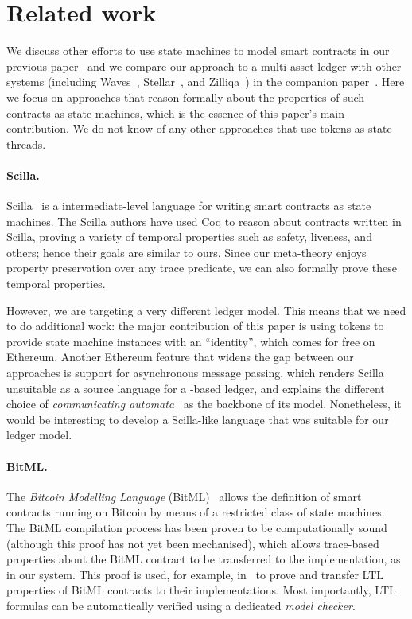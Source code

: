 \section{Related work}
\label{sec:related-work}

We discuss other efforts to use state machines to model smart
contracts in our previous paper~\cite{eutxo-1-paper} and we compare our
 approach to a multi-asset ledger with other systems (including Waves~\cite{waves}, Stellar~\cite{stellar}, and Zilliqa~\cite{scilla-arxiv}) in the companion
paper~\cite{plain-multicurrency}.
Here we focus on approaches that reason formally about the
properties of such contracts as state machines, which is the essence
of this paper's main contribution.
We do not know of any other approaches that use tokens as state threads.

\paragraph{Scilla.}
%
Scilla~\cite{scilla} is a intermediate-level language for writing smart
contracts as state machines.
The Scilla authors have used Coq to reason about contracts written in
Scilla, proving a variety of temporal properties such as safety,
liveness, and others; hence their goals are similar to ours.
Since our meta-theory enjoys property preservation over any trace predicate,
we can also formally prove these temporal properties.

However, we are targeting a very different ledger model.
This means that we need to do additional work: the major contribution
of this paper is using tokens to provide state machine instances with
an ``identity'', which comes for free on Ethereum.
Another Ethereum feature that widens the gap between our approaches is
support for asynchronous message passing,
which renders Scilla unsuitable as a source language for a
\UTXO{}-based ledger,
and explains the different choice of \textit{communicating automata}~\cite{scilla-arxiv}
as the backbone of its model.
Nonetheless, it would be interesting to develop a Scilla-like language
that was suitable for our ledger model.

\paragraph{BitML.}
%
The \textit{Bitcoin Modelling Language} (BitML)~\cite{bitml} allows the definition
of smart contracts running on Bitcoin by means of a restricted class
of state machines.
The BitML compilation process has been proven to be computationally
sound (although this proof has not yet been mechanised), which allows
trace-based properties about the BitML contract to be transferred to
the implementation, as in our system.
This proof is used, for example, in~\cite{atzei2019developing} to prove
and transfer LTL properties of BitML contracts to their implementations.
Most importantly, LTL formulas can be automatically verified using a dedicated \textit{model checker}.

